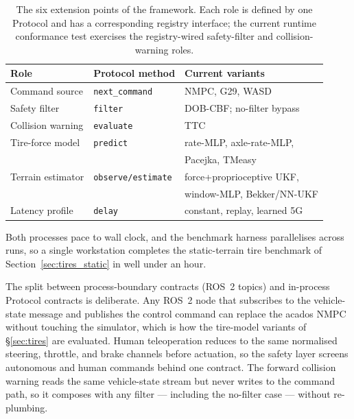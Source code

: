 \documentclass[conference,letterpaper,10pt]{IEEEtran}
\begin{document}
\begin{table}[!t]
  \renewcommand{\arraystretch}{1.15}
  \caption{The six extension points of the framework. Each role is
    defined by one Protocol and has a corresponding registry interface;
    the current runtime conformance test exercises the registry-wired
    safety-filter and collision-warning roles.}
  \label{tab:swap_points}
  \centering
  \scriptsize
  \setlength{\tabcolsep}{3pt}
  \begin{tabular}{@{}lll@{}}
    \toprule
    \textbf{Role} & \textbf{Protocol method} & \textbf{Current variants}\\
    \midrule
    Command source     & \texttt{next\_command}  & NMPC, G29, WASD\\
    Safety filter      & \texttt{filter}         & DOB-CBF; no-filter bypass\\
    Collision warning  & \texttt{evaluate}       & TTC\\
    Tire-force model   & \texttt{predict}        & rate-MLP, axle-rate-MLP,\\
                       &                         & Pacejka, TMeasy\\
    Terrain estimator  & \texttt{observe/estimate} & force+proprioceptive UKF,\\
                       &                         & window-MLP, Bekker/NN-UKF\\
    Latency profile    & \texttt{delay}          & constant, replay, learned 5G\\
    \bottomrule
  \end{tabular}
\end{table}

Both processes pace to wall clock, and the benchmark harness
parallelises across runs, so a single workstation completes the
static-terrain tire benchmark of Section~\ref{sec:tires_static} in
well under an hour.

The split between process-boundary contracts (ROS~2 topics) and
in-process Protocol contracts is deliberate. Any ROS~2 node that
subscribes to the vehicle-state message and publishes the control
command can replace the acados NMPC without touching the simulator,
which is how the tire-model variants of \S\ref{sec:tires} are
evaluated. Human teleoperation reduces to the same normalised steering,
throttle, and brake channels before actuation, so the safety layer
screens autonomous and human commands behind one contract. The forward
collision warning reads the same vehicle-state stream but never writes
to the command path, so it composes with any filter --- including the
no-filter case --- without re-plumbing.
\end{document}
